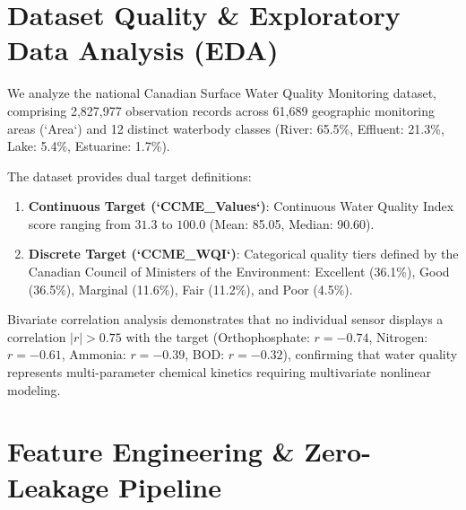 \documentclass[conference]{IEEEtran}
\begin{document}
\section{Dataset Quality \& Exploratory Data Analysis (EDA)}
We analyze the national Canadian Surface Water Quality Monitoring dataset, comprising 2,827,977 observation records across 61,689 geographic monitoring areas (`Area`) and 12 distinct waterbody classes (River: 65.5\%, Effluent: 21.3\%, Lake: 5.4\%, Estuarine: 1.7\%).

The dataset provides dual target definitions:
\begin{enumerate}
    \item \textbf{Continuous Target (`CCME\_Values`)}: Continuous Water Quality Index score ranging from $31.3$ to $100.0$ (Mean: 85.05, Median: 90.60).
    \item \textbf{Discrete Target (`CCME\_WQI`)}: Categorical quality tiers defined by the Canadian Council of Ministers of the Environment: Excellent (36.1\%), Good (36.5\%), Marginal (11.6\%), Fair (11.2\%), and Poor (4.5\%).
\end{enumerate}

Bivariate correlation analysis demonstrates that no individual sensor displays a correlation $|r| > 0.75$ with the target (Orthophosphate: $r = -0.74$, Nitrogen: $r = -0.61$, Ammonia: $r = -0.39$, BOD: $r = -0.32$), confirming that water quality represents multi-parameter chemical kinetics requiring multivariate nonlinear modeling.

\section{Feature Engineering \& Zero-Leakage Pipeline}
\end{document}
